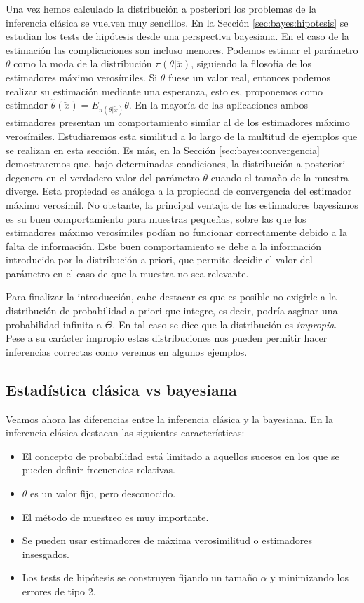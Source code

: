 Una vez hemos calculado la distribución a posteriori los problemas de la inferencia clásica se vuelven muy sencillos. En la Sección \ref{sec:bayes:hipotesis} se estudian los tests de hipótesis desde una perspectiva bayesiana. En el caso de la estimación las complicaciones son incluso menores. Podemos estimar el parámetro $\theta$ como la moda de la distribución $\pi(\theta|\utilde{x})$, siguiendo la filosofía de los estimadores máximo verosímiles. Si $\theta$ fuese un valor real, entonces podemos realizar su estimación mediante una esperanza, esto es, proponemos como estimador $\hat{\theta}(\utilde{x}) = E_{\pi(\theta|\utilde{x})} \theta$. En la mayoría de las aplicaciones ambos estimadores presentan un comportamiento similar al de los estimadores máximo verosímiles. Estudiaremos esta similitud a lo largo de la multitud de ejemplos que se realizan en esta sección. Es más, en la Sección \ref{sec:bayes:convergencia} demostraremos que, bajo determinadas condiciones, la distribución a posteriori degenera en el verdadero valor del parámetro $\theta$ cuando el tamaño de la muestra diverge. Esta propiedad es análoga a la propiedad de convergencia del estimador máximo verosímil. No obstante, la principal ventaja de los estimadores bayesianos es su buen comportamiento para muestras pequeñas, sobre las que los estimadores máximo verosímiles podían no funcionar correctamente debido a la falta de información. Este buen comportamiento se debe a la información introducida por la distribución a priori, que permite decidir el valor del parámetro en el caso de que la muestra no sea relevante.

Para finalizar la introducción, cabe destacar es que es posible no exigirle a la distribución de probabilidad a priori que integre, es decir, podría asginar una probabilidad infinita a $\Theta$. En tal caso se dice que la distribución es \textit{impropia}. Pese a su carácter impropio estas distribuciones nos pueden permitir hacer inferencias correctas como veremos en algunos ejemplos.

\subsection{Estadística clásica vs bayesiana}

Veamos ahora las diferencias entre la inferencia clásica y la bayesiana. En la inferencia clásica destacan las siguientes características:

\begin{itemize}
	\item El concepto de probabilidad está limitado a aquellos sucesos en los que se pueden definir frecuencias relativas.
	\item $\theta$ es un valor fijo, pero desconocido.
	\item El método de muestreo es muy importante.
	\item Se pueden usar estimadores de máxima verosimilitud o estimadores insesgados.
    \item Los tests de hipótesis se construyen fijando un tamaño $\alpha$ y minimizando los errores de tipo 2.
\end{itemize}

